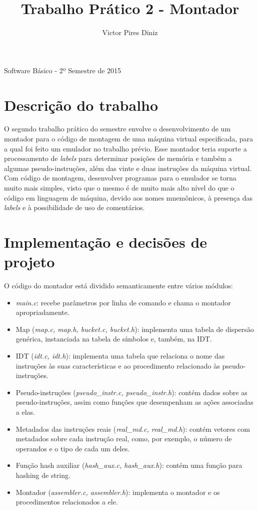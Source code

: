 \documentclass[10pt,a4paper]{article}
\title{Trabalho Prático 2 - Montador}
\author{Victor Pires Diniz}
\numberwithin{equation}{section}
\begin{document}
\maketitle
\begin{center}
Software Básico - 2º Semestre de 2015
\end{center}

\section{Descrição do trabalho}

O segundo trabalho prático do semestre envolve o desenvolvimento de um montador para o código de montagem de uma máquina virtual especificada, para a qual foi feito um emulador no trabalho prévio. Esse montador teria suporte a processamento de \emph{labels} para determinar posições de memória e também a algumas pseudo-instruções, além das vinte e duas instruções da máquina virtual. Com código de montagem, desenvolver programas para o emulador se torna muito mais simples, visto que o mesmo é de muito mais alto nível do que o código em linguagem de máquina, devido aos nomes mnemônicos, à presença das \emph{labels} e à possibilidade de uso de comentários.

\section{Implementação e decisões de projeto}

O código do montador está dividido semanticamente entre vários módulos:

\begin{itemize}
    \item \emph{main.c}: recebe parâmetros por linha de comando e chama o montador apropriadamente.
    \item Map (\emph{map.c, map.h, bucket.c, bucket.h}): implementa uma tabela de dispersão genérica, instanciada na tabela de símbolos e, também, na IDT.
    \item IDT (\emph{idt.c, idt.h}): implementa uma tabela que relaciona o nome das instruções às suas características e ao procedimento relacionado às pseudo-instruções.
    \item Pseudo-instruções (\emph{pseudo\_instr.c, pseudo\_instr.h}): contém dados sobre as pseudo-instruções, assim como funções que desempenham as ações associadas a elas.
    \item Metadados das instruções reais (\emph{real\_md.c, real\_md.h}): contém vetores com metadados sobre cada instrução real, como, por exemplo, o número de operandos e o tipo de cada um deles.
    \item Função hash auxiliar (\emph{hash\_aux.c, hash\_aux.h}): contém uma função para hashing de string.
    \item Montador (\emph{assembler.c, assembler.h}): implementa o montador e os procedimentos relacionados a ele.
\end{itemize}
\end{document}

